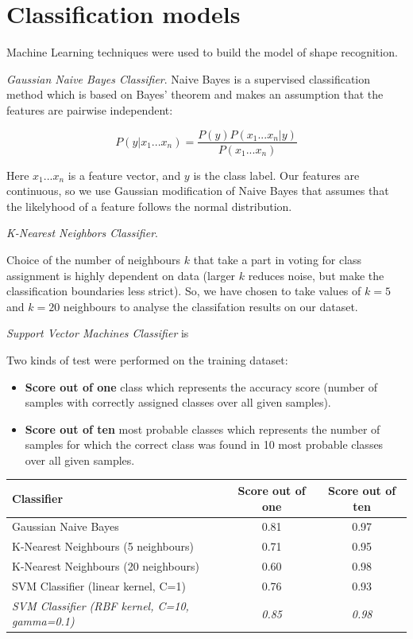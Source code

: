 \documentclass[12pt]{article}
\begin{document}
\section{Classification models}

Machine Learning techniques were used to build the model of shape recognition.  

\textit{Gaussian Naive Bayes Classifier}. Naive Bayes \cite{Bayes} is a supervised classification method which is based on Bayes' theorem and makes an assumption that the features are pairwise independent:

\begin{equation}
	P(y|x_{1} ... x_{n}) = \frac{P(y)P(x_{1} ... x_{n}|y)}{P(x_{1} ... x_{n})}
\end{equation}

Here $x_{1} ... x_{n}$ is a feature vector, and $y$ is the class label. Our features are continuous, so we use Gaussian modification of Naive Bayes that assumes that the likelyhood of a feature follows the normal distribution.

\textit{K-Nearest Neighbors Classifier}\cite{neighb}. 

Choice of the number of neighbours $k$ that take a part in voting for class assignment is highly dependent on data (larger $k$ reduces noise, but make the classification boundaries less strict). So, we have chosen to take values of $k=5$ and $k=20$ neighbours to analyse the classifation results on our dataset.
 
\textit{Support Vector Machines Classifier} is

Two kinds of test were performed on the training dataset:
\begin{itemize}
	\item \textbf{Score out of one} class which represents the accuracy score (number of samples with correctly assigned classes over all given samples).
	\item \textbf{Score out of ten} most probable classes which represents the number of samples for which the correct class was found in 10 most probable classes over all given samples.
\end{itemize}

\begin{center}
  \begin{tabular}{| l | c | c |}
    \hline
    \textbf{Classifier} & \textbf{Score out of one} & \textbf{Score out of ten}\\ \hline \hline
    Gaussian Naive Bayes & 0.81 & 0.97 \\ \hline
	K-Nearest Neighbours (5 neighbours) & 0.71 & 0.95\\ \hline
	K-Nearest Neighbours (20 neighbours) & 0.60 & 0.98 \\ \hline
	SVM Classifier (linear kernel, C=1) & 0.76 & 0.93 \\ \hline
	\textit{SVM Classifier (RBF kernel, C=10, gamma=0.1)} & \textit{0.85} & \textit{0.98} \\ 
	\hline
  \end{tabular}
\end{center}
\end{document}
